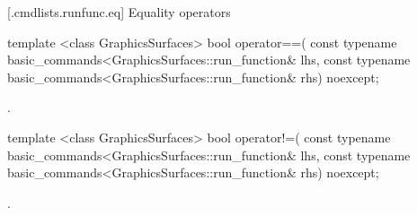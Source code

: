  [\iotwod.cmdlists.runfunc.eq] {Equality operators}%

%
\begin{itemdecl}
template <class GraphicsSurfaces>
bool operator==(
  const typename basic_commands<GraphicsSurfaces::run_function& lhs,
  const typename basic_commands<GraphicsSurfaces::run_function& rhs) 
  noexcept;
\end{itemdecl}
\begin{itemdescr}
\pnum
\returns {}.
\end{itemdescr}

%
\begin{itemdecl}
template <class GraphicsSurfaces>
bool operator!=(
  const typename basic_commands<GraphicsSurfaces::run_function& lhs,
  const typename basic_commands<GraphicsSurfaces::run_function& rhs) 
  noexcept;
\end{itemdecl}
\begin{itemdescr}
\pnum
\returns {}.
\end{itemdescr}
